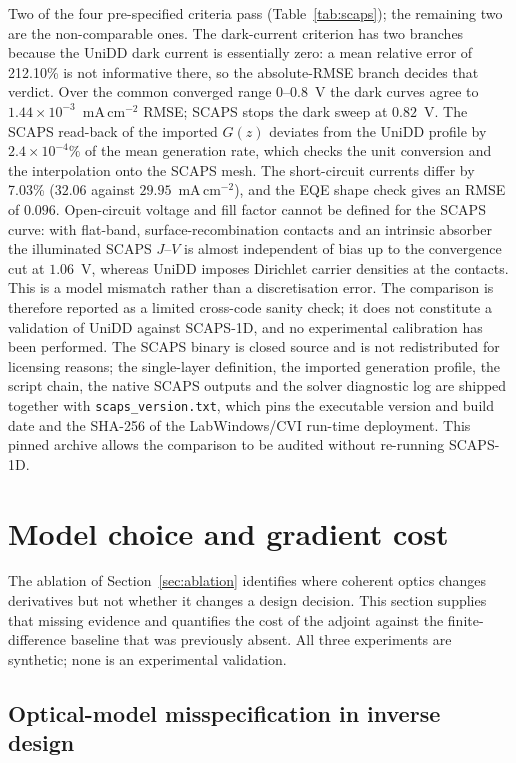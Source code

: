 \documentclass[preprint,12pt]{elsarticle}
\begin{document}
Two of the four pre-specified criteria pass (Table~\ref{tab:scaps}); the
remaining two are the non-comparable ones. The dark-current criterion has two
branches because the UniDD dark current is essentially zero: a mean relative
error of 212.10\% is not informative there, so the absolute-RMSE branch
decides that verdict. Over the common converged range
$0$--$0.8$~V the dark curves agree to
$1.44\times10^{-3}$~mA\,cm$^{-2}$ RMSE; SCAPS stops the dark sweep at
$0.82$~V. The SCAPS read-back of the imported $G(z)$ deviates from the
UniDD profile by $2.4\times10^{-4}\%$ of the mean generation rate, which
checks the unit conversion and the interpolation onto the SCAPS mesh. The
short-circuit currents differ by 7.03\% ($32.06$ against
$29.95$~mA\,cm$^{-2}$), and the EQE shape check gives an RMSE of $0.096$.
Open-circuit voltage and fill factor cannot be defined for the SCAPS curve:
with flat-band, surface-recombination contacts and an intrinsic absorber the
illuminated SCAPS $J$--$V$ is almost independent of bias up to the
convergence cut at $1.06$~V, whereas UniDD imposes Dirichlet carrier
densities at the contacts. This is a model mismatch rather than a
discretisation error. The comparison is therefore reported as a limited
cross-code sanity check; it does not constitute a validation of UniDD
against SCAPS-1D, and no experimental calibration has been performed. The
SCAPS binary is closed source and is not redistributed for licensing
reasons; the single-layer definition, the imported generation profile, the
script chain, the native SCAPS outputs and the solver diagnostic log are
shipped together with \texttt{scaps\_version.txt}, which pins the executable
version and build date and the SHA-256 of the LabWindows/CVI run-time
deployment. This pinned archive allows the comparison to be audited without
re-running SCAPS-1D.

\section{Model choice and gradient cost}
\label{sec:evidence}

The ablation of Section~\ref{sec:ablation} identifies where coherent optics
changes derivatives but not whether it changes a design decision. This
section supplies that missing evidence and quantifies the cost of the
adjoint against the finite-difference baseline that was previously absent.
All three experiments are synthetic; none is an experimental validation.

\subsection{Optical-model misspecification in inverse design}
\label{sec:evidence-inverse}
\end{document}
